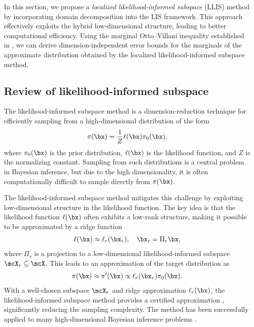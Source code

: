 \documentclass[11pt]{article}
\begin{document}
In this section, we propose a \emph{localized likelihood-informed subspace} (LLIS) method by incorporating domain decomposition into the LIS framework.
%
This approach effectively exploits the hybrid low-dimensional structure, leading to better computational efficiency.
%
Using the marginal Otto--Villani inequality established in , we can derive dimension-independent error bounds for the marginals of the approximate distribution obtained by the localized likelihood-informed subspace method.





\subsection{Review of likelihood-informed subspace}
\label{sec:LIS_review}

The likelihood-informed subspace method is a dimension-reduction technique for efficiently sampling from a high-dimensional distribution of the form
\begin{equation}
\label{eqn:posterior}
    \pi(\bx) = \frac{1}{Z} \ell(\bx) \pi_0(\bx),
\end{equation}
where $\pi_0(\bx)$ is the prior distribution, $\ell(\bx)$ is the likelihood function, and $Z$ is the normalizing constant. 
Sampling from such distributions is a central problem in Bayesian inference, but due to the high dimensionality, it is often computationally difficult to sample directly from $\pi(\bx)$. 



The likelihood-informed subspace method mitigates this challenge by exploiting low-dimensional structure in the likelihood function.
The key idea is that the likelihood function $\ell(\bx)$ often exhibits a low-rank structure, making it possible to be approximated by a ridge function
\begin{equation}
    \ell(\bx) \approx \ell_r(\bx_r), \quad \bx_r = \Pi_r \bx,
\end{equation}
where $\Pi_r$ is a projection to a low-dimensional likelihood-informed subspace $\mcX_r \subseteq \mcX$. This leads to an approximation of the target distribution as 
\begin{equation}
    \pi(\bx) \approx \pi'(\bx) \propto \ell_r(\bx_r) \pi_0(\bx).
\end{equation}
With a well-chosen subspace $\mcX_r$ and ridge approximation $\ell_r(\bx)$, the likelihood-informed subspace method provides a certified approximation \cite{MR4435948,MR4474562}, significantly reducing the sampling complexity. The method has been successfully applied to many high-dimensional Bayesian inference problems \cite{MR3274599,MR3422405}.
\end{document}
